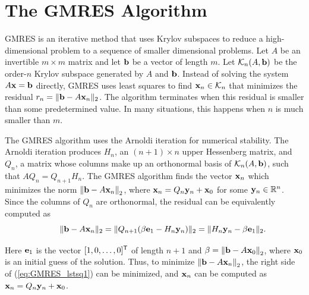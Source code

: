 \section*{The GMRES Algorithm} %

GMRES is an iterative method that uses Krylov subspaces to reduce a high-dimensional problem to a sequence of smaller dimensional problems.
Let $A$ be an invertible $m \times m$ matrix and let $\mathbf{b}$ be a vector of length $m$.
Let $\mathcal{K}_n(A, \mathbf{b})$ be the order-$n$ Krylov subspace generated by $A$ and $\mathbf{b}$.
Instead of solving the system $A\mathbf{x} = \mathbf{b}$ directly, GMRES uses least squares to find $\mathbf{x}_n \in \mathcal{K}_n$ that minimizes the residual $r_n = \|\mathbf{b} - A\mathbf{x}_n\|_2$.
The algorithm terminates when this residual is smaller than some predetermined value.
In many situations, this happens when $n$ is much smaller than $m$.

The GMRES algorithm uses the Arnoldi iteration for numerical stability.
The Arnoldi iteration produces $H_n$, an $(n+1)\times n$ upper Hessenberg matrix, and $Q_n$, a matrix whose columns make up an orthonormal basis of $\mathcal{K}_n(A, \mathbf{b})$, such that $AQ_n = Q_{n+1}H_n$.
The GMRES algorithm finds the vector $\mathbf{x}_n$ which minimizes the norm $\left\lVert\mathbf{b} - A\mathbf{x}_n\right\rVert_2$, where $\mathbf{x}_n = Q_n \mathbf{y}_n  + \mathbf{x}_0$ for some $\mathbf{y}_n \in \mathbb{R}^n$.
Since the columns of $Q_n$ are orthonormal, the residual can be equivalently computed as
\begin{equation}
\qquad \|\mathbf{b} - A\mathbf{x}_n\|_2 = \|Q_{n+1}(\beta \mathbf{e}_1 - H_n \mathbf{y}_n)\|_2 = \|H_n \mathbf{y}_n - \beta \mathbf{e}_1\|_2.
\label{eq:GMRES_lstsq1}
\end{equation}

Here $\mathbf{e}_1$ is the vector $[1, 0, \ldots, 0]^{\mathsf T}$ of length $n+1$ and $\beta=\left\lVert\mathbf{b} - A\mathbf{x}_0\right\rVert_2$, where $\mathbf{x}_0$ is an initial guess of the solution.
Thus, to minimize $\left\lVert\mathbf{b} - A\mathbf{x}_n\right\rVert_2$, the right side of (\ref{eq:GMRES_lstsq1}) can be minimized, and $\mathbf{x}_n $ can be computed as $\mathbf{x}_n=Q_n \mathbf{y}_n + \mathbf{x}_0$.

